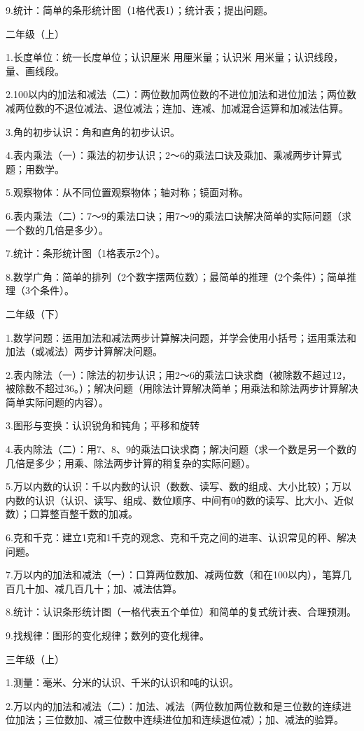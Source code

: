 9.统计：简单的条形统计图（1格代表1）；统计表；提出问题。

二年级（上）

1.长度单位：统一长度单位；认识厘米 用厘米量；认识米 用米量；认识线段，量、画线段。

2.100以内的加法和减法（二）：两位数加两位数的不进位加法和进位加法；两位数减两位数的不退位减法、退位减法；连加、连减、加减混合运算和加减法估算。

3.角的初步认识：角和直角的初步认识。

4.表内乘法（一）：乘法的初步认识；2～6的乘法口诀及乘加、乘减两步计算式题；用数学。

5.观察物体：从不同位置观察物体；轴对称；镜面对称。

6.表内乘法（二）：7～9的乘法口诀；用7～9的乘法口诀解决简单的实际问题（求一个数的几倍是多少）。

7.统计：条形统计图（1格表示2个）。

8.数学广角：简单的排列（2个数字摆两位数）；最简单的推理（2个条件）；简单推理（3个条件）。

二年级（下）

1.数学问题：运用加法和减法两步计算解决问题，并学会使用小括号；运用乘法和加法（或减法）两步计算解决问题。

2.表内除法（一）：除法的初步认识；用2～6的乘法口诀求商（被除数不超过12，被除数不超过36。）；解决问题（用除法计算解决简单；用乘法和除法两步计算解决简单实际问题的内容）。

3.图形与变换：认识锐角和钝角；平移和旋转

4.表内除法（二）：用7、8、9的乘法口诀求商；解决问题（求一个数是另一个数的几倍是多少；用乘、除法两步计算的稍复杂的实际问题）。

5.万以内数的认识：千以内数的认识（数数、读写、数的组成、大小比较）；万以内数的认识（认识、读写、组成、数位顺序、中间有0的数的读写、比大小、近似数）；口算整百整千数的加减。

6.克和千克：建立1克和1千克的观念、克和千克之间的进率、认识常见的秤、解决问题。

7.万以内的加法和减法（一）：口算两位数加、减两位数（和在100以内），笔算几百几十加、减几百几十；加、减法估算。

8.统计：认识条形统计图（一格代表五个单位）和简单的复式统计表、合理预测。

9.找规律：图形的变化规律；数列的变化规律。

三年级（上）

1.测量：毫米、分米的认识、千米的认识和吨的认识。

2.万以内的加法和减法（二）：加法、减法（两位数加两位数和是三位数的连续进位加法；三位数加、减三位数中连续进位加和连续退位减）；加、减法的验算。

